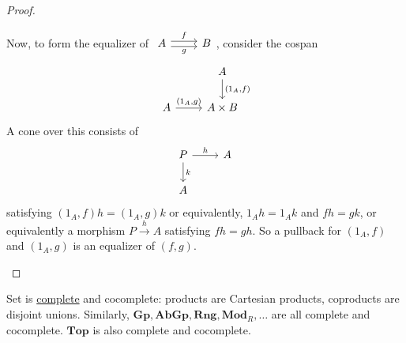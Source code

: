 \documentclass{article}
\newcommand{\named}[1]{\textbf{#1}\index{#1}}
\let\to\longrightarrow
\begin{document}
\begin{proof}
\begin{enumerate}[label=(\roman*)]
    Now, to form the equalizer of $\begin{tikzcd}A \rar[shift left]{f} \rar[shift right,']{g} & B\end{tikzcd}$, consider the cospan
    \begin{equation*}
      \begin{tikzcd}
        &A \dar{(1_A,f)} \\
        A \rar{(1_A, g)} & A \times B
      \end{tikzcd}
    \end{equation*}
    A cone over this consists of
    \begin{equation*}
      \begin{tikzcd}
      P \rar{h} \dar{k} & A \\ A
      \end{tikzcd}
    \end{equation*}
    satisfying $(1_A, f) h = (1_A, g) k$ or equivalently, $1_A h = 1_A k$ and $fh = gk$, or equivalently a morphism $P \overset{h}\to A$ satisfying $fh = gh$.
    So a pullback for $(1_A,f)$ and $(1_A, g)$ is an equalizer of $(f,g)$. \qedhere
   \end{enumerate}
\end{proof}
Set is \hyperlink{def:complete}{complete} and cocomplete: products are Cartesian products, coproducts are disjoint unions.
Similarly, $\mathbf{Gp}, \mathbf{AbGp}, \mathbf{Rng}, \mathbf{Mod}_R, \dotsc$ are all complete and cocomplete.
$\mathbf{Top}$ is also complete and cocomplete.
\end{document}
